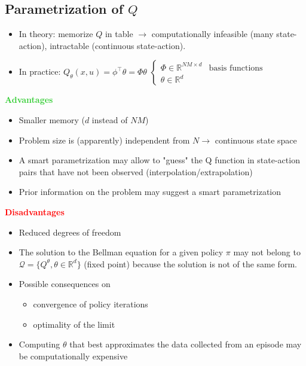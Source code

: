 \subsection{Parametrization of $Q$}
\begin{itemize}
    \item In theory: memorize $Q$ in table $\rightarrow$ computationally infeasible (many state-action), intractable (continuous state-action).
    \item In practice: $\boxed{Q_\theta(x,u) = \phi^\top\theta = \Phi\theta}$ 
    $\begin{cases}
        \Phi \in \mathbb{R}^{NM \times d} & \text{basis functions} \\
        \theta \in \mathbb{R}^d &
    \end{cases}$
\end{itemize}
\begin{minipage}[t]{0.48\textwidth}
    \textbf{\textcolor{LimeGreen}{Advantages}}
    \begin{itemize}
        \item Smaller memory ($d$ instead of $NM$)
        \item Problem size is (apparently) independent from $N \rightarrow$ continuous state space
        \item A smart parametrization may allow to "guess" the Q function in state-action pairs that have not been observed (interpolation/extrapolation)
        \item Prior information on the problem may suggest a smart parametrization
    \end{itemize}
\end{minipage}
\begin{minipage}[t]{0.48\textwidth}
    \textbf{\textcolor{red}{Disadvantages}}
    \begin{itemize}
        \item Reduced degrees of freedom
        \item The solution to the Bellman equation for a given policy $\pi$ may not belong to $\mathcal{Q} = \{ Q^\theta, \theta \in \mathbb{R}^d \}$ (fixed point) because the solution is not of the same form.
        \item Possible consequences on
        \begin{itemize}
            \item convergence of policy iterations
            \item optimality of the limit
        \end{itemize}
        \item Computing $\theta$ that best approximates the data collected from an episode may be computationally expensive
    \end{itemize}
\end{minipage}\\
